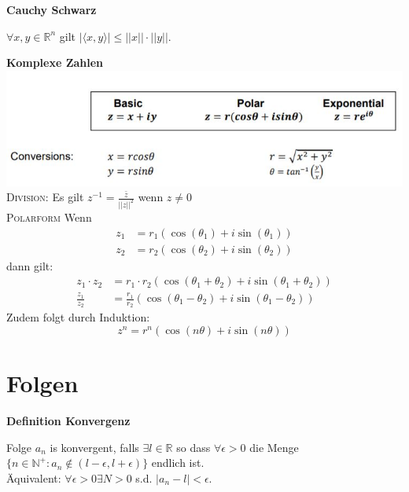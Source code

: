 \documentclass[25pt]{sciposter}
\newcommand{\R}{\mathbb{R}}
\newenvironment{method}[1]{\begin{mdframed}[backgroundcolor=blue!10,innertopmargin=15pt, innerbottommargin=15pt, nobreak=true]
		\textbf{#1 }
	}
	{ 
	\end{mdframed}
}
\begin{document}
\begin{multicols}{3}
\begin{method}{Cauchy Schwarz}
$\forall x,y\in \R^n$ gilt $|\langle x,y\rangle| \leq ||x||\cdot||y||$.
\end{method}


\begin{method}{Komplexe Zahlen}\\
\includegraphics[scale=1.4]{complex.jpg}\\
\textsc{Division:} Es gilt $z^{-1} = \frac{\bar{z}}{||z||^2}$ wenn $z \not = 0$\\
\textsc{Polarform} Wenn \begin{align*}
z_1 &= r_1(\cos(\theta_1) + i\sin(\theta_1))\\
z_2 &= r_2(\cos(\theta_2) + i\sin(\theta_2))
\end{align*}
dann gilt: 
\begin{align*}
z_1 \cdot z_2 &= r_1 \cdot r_2 \left(\cos(\theta_1 + \theta_2) + i\sin(\theta_1 + \theta_2)\right)\\
\frac{z_1}{z_2} &= \frac{r_1}{r_2}\left(\cos(\theta_1 - \theta_2) + i\sin(\theta_1 - \theta_2)\right)
\end{align*}
Zudem folgt durch Induktion:
$$z^n = r^n (\cos(n\theta) + i \sin(n \theta))$$
\end{method}






\section{Folgen}

\begin{method}{Definition Konvergenz}
Folge $a_n$ is konvergent, falls $\exists l \in \mathbb{R}$ so dass $\forall \epsilon > 0$ die Menge $\{n \in \mathbb{N}^+: a_n \not \in (l-\epsilon, l + \epsilon)\}$ endlich ist. \\
Äquivalent: $\forall \epsilon > 0 \exists N >  0$ s.d. $|a_n - l|< \epsilon$.
\end{method}


\end{multicols}
\end{document}
